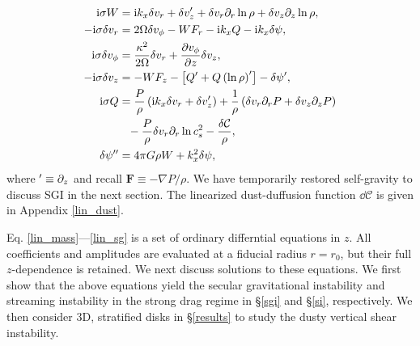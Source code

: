 \begin{align}
  \ii\sigma W &= \ii k_x \dd v_r + \dd v_z^\prime +
  \dd v_r \p_r\ln{\rho} + \dd v_z\p_z\ln{\rho},\label{lin_mass}\\
  -\ii\sigma\dd v_r  &= 2\Omega\dd v_\phi 
- W F_r - \ii k_x Q - \ii k_x\dd\psi,\label{lin_xmom}\\
  \ii\sigma\dd v_\phi &= \frac{\kappa^2}{2\Omega}\dd v_r + \frac{\p
    v_\phi}{\p z}\dd v_z, \label{lin_ymom}\\
  -\ii\sigma\dd v_z &= - W F_z - \left[Q^\prime + Q
    \left(\ln{\rho}\right)^\prime\right] - \dd\psi^\prime  %
,\label{lin_zmom}\\
  \ii\sigma Q &= \frac{P}{\rho}\left(\ii k_x \dd v_r + \dd
               v_z^\prime\right) + \frac{1}{\rho}\left(\dd v_r\p_rP + \dd v_z \p_zP\right)\notag\\
                &\phantom{=}-\frac{P}{\rho} \dd v_r\p_r
               \ln{c_s^2} %
               - \frac{\dd\mathcal{C}}{\rho},\label{lin_energy}\\
\dd\psi^{\prime\prime}  &= 4\pi G \rho W + k_x^2\dd\psi, \label{lin_sg}
\end{align}  
where $^\prime \equiv \partial_z$ and recall $\bm{F} \equiv -\nabla
P/\rho$. We have temporarily restored self-gravity  to
discuss SGI in the next
section. The linearized dust-duffusion function 
$\dd\mathcal{C}$ is given in  Appendix \ref{lin_dust}. 


Eq. \ref{lin_mass}---\ref{lin_sg} is a set of ordinary
differntial equations in $z$. All coefficients and amplitudes are
evaluated at a fiducial radius $r=r_0$, but their full $z$-dependence
is retained. We next discuss solutions to these equations.  We first
show that the above equations yield the secular
gravitational instability and streaming instability in the strong
drag regime in \S\ref{sgi} and \S\ref{si}, respectively. We then
consider 3D, stratified disks in \S\ref{results} to study the dusty
vertical shear instability.

